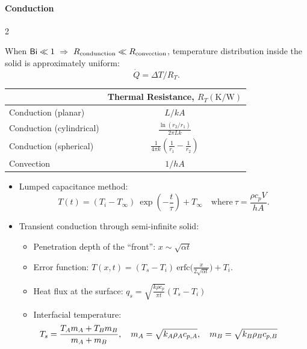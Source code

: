 \documentclass[10pt, a4paper, table]{article}
\newcommand{\Bi}{\mathsf{Bi}}
\begin{document}
\begin{mdframed}\vspace{-.5cm}
\paragraph{Conduction}
\begin{multicols}{2}

When $\Bi \ll 1 \ \Rightarrow \ R_{\rm condunction} \ll R_{\rm convection}$, temperature distribution inside the solid is approximately uniform:
\[
    \dot{Q} = \Delta T / R_{T}.
\]

\begin{table}[H] \vspace{-.5cm}
    \centering
    \begin{tabular}{lc}
    \toprule
    & \textbf{Thermal Resistance, $R_{T}(\mathrm{K}/\mathrm{W})$}\\ 
    \midrule
    Conduction (planar)  & $L/kA$\\[2ex]
    Conduction (cylindrical) & $\displaystyle \frac{\ln(r_{2}/r_{1})}{2\pi Lk}$\\[2ex]
    Conduction (spherical)  & $\displaystyle \frac{1}{4\pi k} \left(\frac{1}{r_{1}}-\frac{1}{r_{2}}\right)$\\[2ex] 
    Convection &  $1/hA$\\
    \bottomrule
    \end{tabular}
\end{table} 

\begin{itemize}
    \item Lumped capacitance method: 
    \[
        \displaystyle T(t) =( T_{i} - T_{\infty} ) \ \exp\left( -\frac{t}{\tau} \right) + T_{\infty} 
        \quad \text{where} \ 
        \tau=\frac{\rho c_{p} V}{hA}.
    \]

    \item Transient conduction through semi-infinite solid:
	\begin{itemize}
            \item Penetration depth of the ``front'': $x  \sim  \sqrt{\alpha t}$
            
            \item Error function: $\displaystyle T(x, t) = (T_{s}-T_{i}) \ \mathrm{erfc}\bigg(\frac{x}{2\sqrt{\alpha t}}\bigg)+T_{i}$.
            
            \item Heat flux at the surface: $\displaystyle q_{s} = \sqrt{\frac{k \rho c_{p}}{\pi t}}(T_{s}-T_{i})$

            \item Interfacial temperature:
            \[\hspace{-1cm}
                T_{s}=\frac{T_{A}m_{A}+T_{B}m_{B}}{m_{A}+m_{B}}, \quad m_{A} = \sqrt{k_{A}\rho_{A}c_{p,A}}, \quad m_{B} = \sqrt{k_{B}\rho_{B}c_{p,B}}
            \]
	\end{itemize}
\end{itemize}
\end{multicols}
\end{mdframed}
\end{document}
